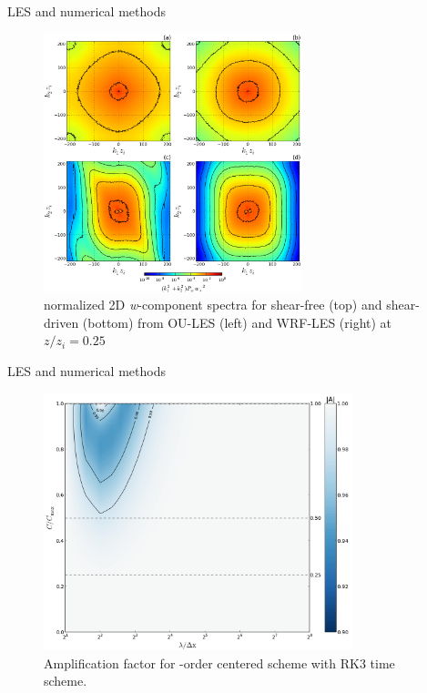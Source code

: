 
\begin{frame}{LES and numerical methods}

\begin{figure}
	\includegraphics[width=0.67\textwidth]{gibbs6}
	\caption{\scriptsize normalized 2D \textit{w}-component spectra for shear-free (top) and shear-driven (bottom) from OU-LES (left) and WRF-LES (right) at $z/z_i=0.25$}
\end{figure}

\end{frame}



\begin{frame}{LES and numerical methods}

\begin{figure}
	\includegraphics[width=0.8\textwidth]{gibbs7}
	\caption{\scriptsize Amplification factor for -order centered scheme with RK3 time scheme.}
\end{figure}

\end{frame}

